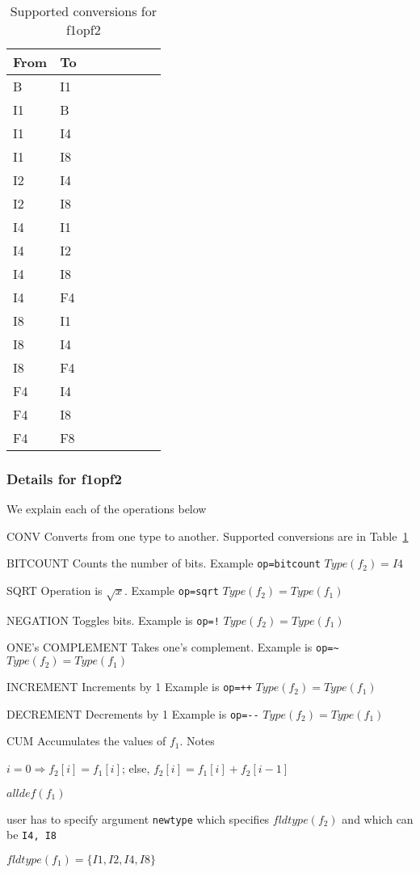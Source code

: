 \documentclass{report}
\begin{document}
\begin{table}[hb]
\centering
\begin{tabular}{|l||l|l|l|l|l|l|l|}  \hline \hline
{\bf From} & {\bf To} \\ \hline \hline
B  & I1 \\ \hline 
\hline
I1 & B \\ \hline 
I1 & I4 \\ \hline 
I1 & I8 \\ \hline 
\hline
I2 & I4 \\ \hline 
I2 & I8 \\ \hline 
%
\hline
I4 & I1 \\ \hline 
I4 & I2 \\ \hline 
I4 & I8 \\ \hline 
I4 & F4 \\ \hline 
%
\hline
I8 & I1 \\ \hline 
I8 & I4 \\ \hline 
I8 & F4 \\ \hline 
%
\hline
F4 & I4 \\ \hline 
F4 & I8 \\ \hline 
F4 & F8 \\ \hline 
\hline
\end{tabular}
\caption{Supported conversions for f1opf2}
\label{tbl_conversions}
\end{table}


\subsubsection{Details for f1opf2}
\label{details_f1opf2}
We explain each of the operations below
\bd
\item [CONV] Converts from one type to another. Supported conversions
are in Table~\ref{tbl_conversions}
\item [BITCOUNT] 
Counts the number of bits.
Example \verb+op=bitcount+
\(Type(f_2) = I4\)
\item [SQRT] 
Operation is \(\sqrt{x}\). 
Example \verb+op=sqrt+
\(Type(f_2) = Type(f_1)\)
\item [NEGATION] Toggles bits. 
Example is \verb+op=!+
\(Type(f_2) = Type(f_1)\)
\item [ONE's COMPLEMENT] 
Takes one's complement. 
Example is \verb+op=~+
\(Type(f_2) = Type(f_1)\)
\item [INCREMENT]
Increments by 1
Example is \verb~op=++~
\(Type(f_2) = Type(f_1)\)
\item [DECREMENT]
Decrements by 1
Example is \verb~op=--~
\(Type(f_2) = Type(f_1)\)
\item [CUM] 
Accumulates the values of \(f_1\).  Notes
\be
\item 
\(i = 0 \Rightarrow f_2[i] = f_1[i]\); else, \(f_2[i] = f_1[i] + f_2[i-1]\)
\item \(alldef(f_1)\)
\item user has to specify argument {\tt newtype} which specifies
\(fldtype(f_2)\) and which can be {\tt I4, I8}
\item \(fldtype(f_1) = \{I1, I2, I4, I8\}\)
\ee
\end{document}
